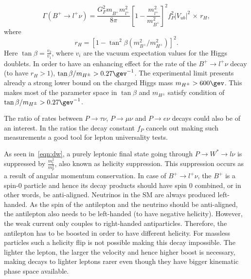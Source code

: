 \begin{equation}
\Gamma(B^{+} \rightarrow {l^{+}} \nu)=  
        \frac{G_{F}^{2} m^{}_{B^{+}}  m_{l^{+}}^{2}}{8\pi} 
        \left[1 - \frac{m_{l^{+}}^{2}}{m_{B^{+}}^{2}}\right]^{2}  
	f_{P}^{2} |V_{ub}|^{2} \,\times\, r_H,
\end{equation}
where
\begin{equation}
	r_H=[1-\tan^2\beta(m^{2}_{B^{+}}/m^{2}_{H^{+}})]^2.
\end{equation}
Here $\tan\beta = \frac{v_{2}}{v_{1}}$, where $v_{i}$ are the vacuum expectation values for the Higgs doublets. In order to have an enhancing effect for the rate of the $B^{+}\rightarrow l^{+}\nu$ decay (to have $r_{H}>1$), $\tan\beta/m_{H^{\pm}}> 0.27 \gev^{-1}$. The experimental limit presents already a strong lower bound on the charged Higgs mass $m_{H^{\pm}}>600\gev$\cite{Arbey:2017gmh}. This makes \DIFdelbegin {}\DIFdelend most of the parameter space in $\tan\beta$ and $m_{H^{\pm}}$ satisfy \DIFdelbegin {}\DIFdelend \DIFaddbegin {}\DIFaddend condition of $\tan\beta/m_{H^{\pm}}>0.27 \gev^{-1}$.

The ratio of rates between $P\rightarrow\tau\nu$, $P\rightarrow\mu\nu$ and $P\rightarrow e\nu$ decays could also be of an interest. In the ratios the decay constant $f_{P}$ cancels out making such measurements a good tool for lepton universality tests.

As seen in~\autoref{eqn:dw}, a purely leptonic final state going through $P\rightarrow W^{*}\rightarrow l \nu$ is suppressed by $\frac{m^{2}_{l}}{m^{2}_{p}}$, also known as helicity suppression. This suppression occurs as a result of angular momentum conservation. In case of $B^{+}\rightarrow l^{+} \nu$, the $B^{+}$ is a spin-0 particle and hence its decay products should have spin 0 combined, or in other words, be anti-aligned. Neutrinos in the \gls{SM} are always produced left-handed. As the spin of the antilepton and the neutrino should be anti-aligned, the antilepton also needs to be left-handed (to have negative helicity). However, the weak current only couples to right-handed antiparticles. Therefore, the antilepton has to be boosted in order to have different helicity. For massless particles such a helicity flip is not possible making this decay impossible. The lighter the lepton, the larger the velocity and hence higher boost is necessary, making decays to lighter leptons rarer even though they have bigger kinematic phase space available.

